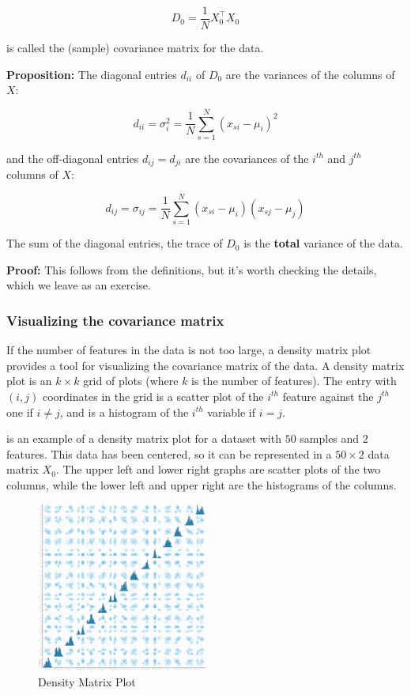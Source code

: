 \documentclass[
]{article}
\begin{document}
\[
D_{0} = \frac{1}{N}X_{0}^{\intercal}X_{0}
\]

is called the (sample) covariance matrix for the data.

\textbf{Proposition:} The diagonal entries \(d_{ii}\) of \(D_{0}\) are
the variances of the columns of \(X\):

\[
d_{ii} = \sigma_{i}^2 = \frac{1}{N}\sum_{s=1}^{N}(x_{si}-\mu_i)^2
\]

and the off-diagonal entries \(d_{ij} = d_{ji}\) are the covariances of
the \(i^{th}\) and \(j^{th}\) columns of \(X\):

\[
d_{ij} = \sigma_{ij} = \frac{1}{N}\sum_{s=1}^{N}(x_{si}-\mu_{i})(x_{sj}-\mu_{j})
\]

The sum of the diagonal entries, the trace of \(D_{0}\) is the
\textbf{total} variance of the data.

\textbf{Proof:} This follows from the definitions, but it's worth
checking the details, which we leave as an exercise.

\hypertarget{sec:visualizecovar}{%
\subsubsection{Visualizing the covariance
matrix}\label{sec:visualizecovar}}

If the number of features in the data is not too large, a density matrix
plot provides a tool for visualizing the covariance matrix of the data.
A density matrix plot is an \(k\times k\) grid of plots (where \(k\) is
the number of features). The entry with \((i,j)\) coordinates in the
grid is a scatter plot of the \(i^{th}\) feature against the \(j^{th}\)
one if \(i\not=j\), and is a histogram of the \(i^{th}\) variable if
\(i=j\).

 is an example of a density matrix plot for a dataset
with \(50\) samples and \(2\) features. This data has been centered, so
it can be represented in a \(50\times 2\) data matrix \(X_{0}\). The
upper left and lower right graphs are scatter plots of the two columns,
while the lower left and upper right are the histograms of the columns.

\begin{figure}
\hypertarget{fig:density0}{%
\centering
\includegraphics[width=0.5\textwidth,height=\textheight]{../img/density.png}
\caption{Density Matrix Plot}\label{fig:density0}
}
\end{figure}
\end{document}
